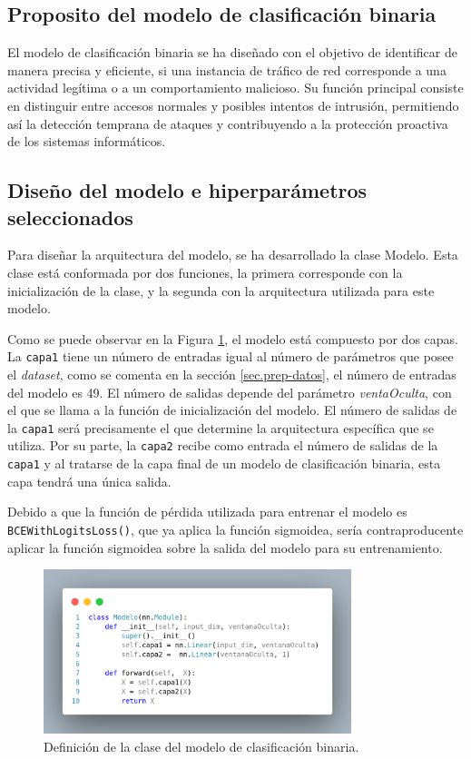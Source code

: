 
\subsection{Proposito del modelo de clasificación binaria}
El modelo de clasificación binaria se ha diseñado con el objetivo de identificar de manera precisa y eficiente, si una instancia de tráfico de red corresponde a una actividad legítima o a un comportamiento malicioso. Su función principal consiste en distinguir entre accesos normales y posibles intentos de intrusión, permitiendo así la detección temprana de ataques y contribuyendo a la protección proactiva de los sistemas informáticos.

\subsection{Diseño del modelo e hiperparámetros seleccionados} \label{sec:disBIN}
Para diseñar la arquitectura del modelo, se ha desarrollado la clase Modelo. Esta clase está conformada por dos funciones, la primera corresponde con la inicialización de la clase, y la segunda con la arquitectura utilizada para este modelo.

Como se puede observar en la Figura \ref{fig:modBIN}, el modelo está compuesto por dos capas. La \texttt{capa1} tiene un número de entradas igual al número de parámetros que posee el \textit{dataset}, como se comenta en la sección \ref{sec.prep-datos}, el número de entradas del modelo es 49. El número de salidas depende del parámetro \textit{ventaOculta}, con el que se llama a la función de inicialización del modelo. El número de salidas de la \texttt{capa1} será precisamente el que determine la arquitectura específica que se utiliza. Por su parte, la \texttt{capa2} recibe como entrada el número de salidas de la \texttt{capa1} y al tratarse de la capa final de un modelo de clasificación binaria, esta capa tendrá una única salida.

Debido a que la función de pérdida utilizada para entrenar el modelo es \texttt{BCEWithLogitsLoss()}, que ya aplica la función sigmoidea, sería contraproducente aplicar la función sigmoidea sobre la salida del modelo para su entrenamiento.

\begin{figure}[H]
    \centering
    \includegraphics[width=0.8\textwidth]{./img/modelo/modeloBIN.png}
    \caption{Definición de la clase del modelo de clasificación binaria.}
    \label{fig:modBIN}
\end{figure}

